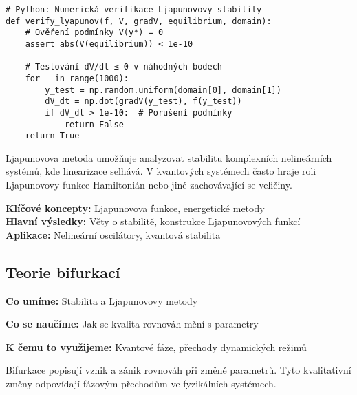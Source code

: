 \begin{application}
\begin{verbatim}
# Python: Numerická verifikace Ljapunovovy stability
def verify_lyapunov(f, V, gradV, equilibrium, domain):
    # Ověření podmínky V(y*) = 0
    assert abs(V(equilibrium)) < 1e-10
    
    # Testování dV/dt ≤ 0 v náhodných bodech
    for _ in range(1000):
        y_test = np.random.uniform(domain[0], domain[1])
        dV_dt = np.dot(gradV(y_test), f(y_test))
        if dV_dt > 1e-10:  # Porušení podmínky
            return False
    return True
\end{verbatim}
\end{application}

\begin{keyinsight}
Ljapunovova metoda umožňuje analyzovat stabilitu komplexních nelineárních systémů, kde linearizace selhává. V kvantových systémech často hraje roli Ljapunovovy funkce Hamiltonián nebo jiné zachovávající se veličiny.
\end{keyinsight}

\begin{summary}
\textbf{Klíčové koncepty:} Ljapunovova funkce, energetické metody \\
\textbf{Hlavní výsledky:} Věty o stabilitě, konstrukce Ljapunovových funkcí \\
\textbf{Aplikace:} Nelineární oscilátory, kvantová stabilita
\end{summary}

\spc

\subsection{Teorie bifurkací}

\begin{scaffold}
\item[] \textbf{Co umíme:} Stabilita a Ljapunovovy metody
\item[] \textbf{Co se naučíme:} Jak se kvalita rovnováh mění s parametry  
\item[] \textbf{K čemu to využijeme:} Kvantové fáze, přechody dynamických režimů
\end{scaffold}

\begin{motivation}
Bifurkace popisují vznik a zánik rovnováh při změně parametrů. Tyto kvalitativní změny odpovídají fázovým přechodům ve fyzikálních systémech.
\end{motivation}

